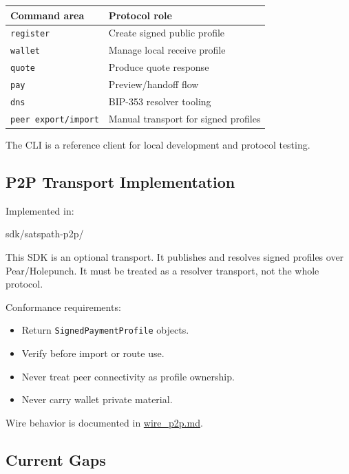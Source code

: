 \documentclass[
]{article}
\newenvironment{Shaded}{}{}
\newcommand{\NormalTok}[1]{#1}
\providecommand{\tightlist}{%
  \setlength{\itemsep}{0pt}\setlength{\parskip}{0pt}}
\begin{document}
\begin{longtable}[]{@{}ll@{}}
\toprule\noalign{}
Command area & Protocol role \\
\midrule\noalign{}
\endhead
\bottomrule\noalign{}
\endlastfoot
\texttt{register} & Create signed public profile \\
\texttt{wallet} & Manage local receive profile \\
\texttt{quote} & Produce quote response \\
\texttt{pay} & Preview/handoff flow \\
\texttt{dns} & BIP-353 resolver tooling \\
\texttt{peer\ export/import} & Manual transport for signed profiles \\
\end{longtable}

The CLI is a reference client for local development and protocol
testing.

\hypertarget{p2p-transport-implementation}{%
\subsection{P2P Transport
Implementation}\label{p2p-transport-implementation}}

Implemented in:

\begin{Shaded}
\begin{Highlighting}[]
\NormalTok{sdk/satspath{-}p2p/}
\end{Highlighting}
\end{Shaded}

This SDK is an optional transport. It publishes and resolves signed
profiles over Pear/Holepunch. It must be treated as a resolver
transport, not the whole protocol.

Conformance requirements:

\begin{itemize}
\tightlist
\item
  Return \texttt{SignedPaymentProfile} objects.
\item
  Verify before import or route use.
\item
  Never treat peer connectivity as profile ownership.
\item
  Never carry wallet private material.
\end{itemize}

Wire behavior is documented in \href{./wire_p2p.md}{wire\_p2p.md}.

\hypertarget{current-gaps}{%
\subsection{Current Gaps}\label{current-gaps}}
\end{document}
